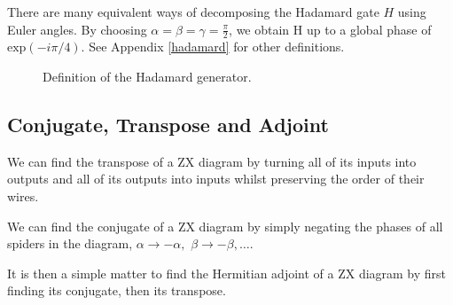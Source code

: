 There are many equivalent ways of decomposing the Hadamard gate $H$ using Euler angles. By choosing $\alpha = \beta = \gamma = \frac{\pi}{2}$, we obtain H up to a global phase of $\text{exp}(-i\pi/4)$. See Appendix \ref{hadamard} for other definitions.

\begin{figure}[H]
\caption{Definition of the Hadamard generator.}
\end{figure}


\subsection{Conjugate, Transpose and Adjoint}

We can find the transpose of a ZX diagram by turning all of its inputs into outputs and all of its outputs into inputs whilst preserving the order of their wires.


We can find the conjugate of a ZX diagram by simply negating the phases of all spiders in the diagram, $\alpha \rightarrow -\alpha, \,\, \beta \rightarrow -\beta, \dots$.


It is then a simple matter to find the Hermitian adjoint of a ZX diagram by first finding its conjugate, then its transpose.


